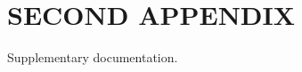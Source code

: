 \documentclass{UCF_ETD}
\begin{document}
\chapter{SECOND APPENDIX}
\newpage

Supplementary documentation.

\backmatter

\begin{thebibliography}{99}





\cite{alkhateeb2023deepsense}
\cite{charan2022multi}
\cite{zhu2020deformable}
\cite{salameh20225g}




\end{thebibliography}
\end{document}
